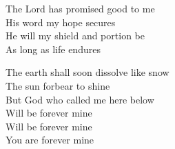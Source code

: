 \documentclass{beamer}
\begin{document}
{\begin{frame}{}
\end{frame}

\hypertarget{Amazing grace['My chains are gone'](Tomlin)3}{}
\begin{frame}{}
\fontsize{ 18 }{ 23 }\selectfont

The Lord has promised good to me\\ 
His word my hope secures\\ 
He will my shield and portion be\\ 
As long as life endures 

\end{frame}

\hypertarget{Amazing grace['My chains are gone'](Tomlin)4}{}
\begin{frame}{}
\fontsize{ 18 }{ 23 }\selectfont

The earth shall soon dissolve like snow\\ 
The sun forbear to shine\\ 
But God who called me here below\\ 
Will be forever mine\\ 
Will be forever mine\\ 
You are forever mine 

\end{frame}

}
\end{document}
